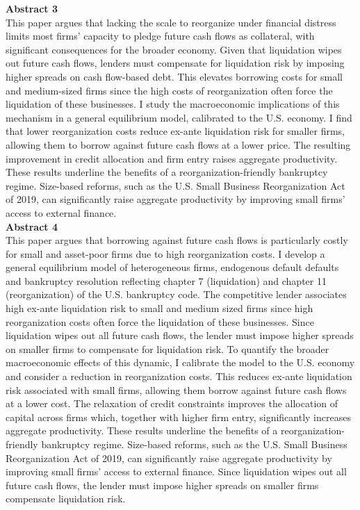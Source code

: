 \documentclass[12pt]{article}
\begin{document}
\textbf{Abstract 3} \\
This paper argues that lacking the scale to reorganize under financial distress limits most firms' capacity to pledge future cash flows as collateral, with significant consequences for the broader economy. Given that liquidation wipes out future cash flows, lenders must compensate for liquidation risk by imposing higher spreads on cash flow-based debt. This elevates borrowing costs for small and medium-sized firms since the high costs of reorganization often force the liquidation of these businesses. I study the macroeconomic implications of this mechanism in a general equilibrium model, calibrated to the U.S. economy. I find that lower reorganization costs reduce ex-ante liquidation risk for smaller firms, allowing them to borrow against future cash flows at a lower price. The resulting improvement in credit allocation and firm entry raises aggregate productivity. These results underline the benefits of a reorganization-friendly bankruptcy regime. Size-based reforms, such as the U.S. Small Business Reorganization Act of 2019, can significantly raise aggregate productivity by improving small firms’ access to external finance. \\
\textbf{Abstract 4} \\
This paper argues that borrowing against future cash flows is particularly costly for small and asset-poor firms due to high reorganization costs. I develop a general equilibrium model of heterogeneous firms, endogenous default defaults and bankruptcy resolution reflecting chapter 7 (liquidation) and chapter 11 (reorganization) of the U.S. bankruptcy code. The competitive lender associates high ex-ante liquidation risk to small and medium sized firms since high reorganization costs often force the liquidation of these businesses. Since liquidation wipes out all future cash flows, the lender must impose higher spreads on smaller firms to compensate for liquidation risk. To quantify the broader macroeconomic effects of this dynamic, I calibrate the model to the U.S. economy and consider a reduction in reorganization costs. This reduces ex-ante liquidation risk associated with small firms, allowing them borrow against future cash flows at a lower cost. The relaxation of credit constraints improves the allocation of capital across firms which, together with higher firm entry, significantly increases aggregate productivity. These results underline the benefits of a reorganization-friendly bankruptcy regime. Size-based reforms, such as the U.S. Small Business Reorganization Act of 2019, can significantly raise aggregate productivity by improving small firms’ access to external finance. Since liquidation wipes out all future cash flows, the lender must impose higher spreads on smaller firms compensate liquidation risk. 
\end{document}
